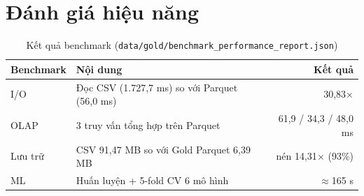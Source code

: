 \chapter{Đánh giá hiệu năng}
\label{chap:benchmark}

\begin{table}[H]
\centering
\caption{Kết quả benchmark (\texttt{data/gold/benchmark\_performance\_report.json})}
\label{tab:bench}
\begin{tabularx}{\linewidth}{lXr}
\toprule
\textbf{Benchmark} & \textbf{Nội dung} & \textbf{Kết quả} \\ \midrule
I/O    & Đọc CSV (1.727,7 ms) so với Parquet (56,0 ms) & 30,83$\times$ \\
OLAP   & 3 truy vấn tổng hợp trên Parquet & 61,9 / 34,3 / 48,0 ms \\
Lưu trữ & CSV 91,47 MB so với Gold Parquet 6,39 MB & nén 14,31$\times$ (93\%) \\
ML     & Huấn luyện + 5-fold CV 6 mô hình & $\approx$165 s \\
\bottomrule
\end{tabularx}
\end{table}
